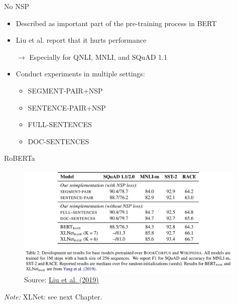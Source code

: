 
\begin{frame}{No NSP}

\vfill

	\begin{itemize}
		\item Described as important part of the pre-training process in BERT
		\item Liu et al. report that it hurts performance
		\item[$\to$] Especially for QNLI, MNLI, and SQuAD 1.1
		\item Conduct experiments in multiple settings: 
			\begin{itemize}
				\item SEGMENT-PAIR+NSP
				\item SENTENCE-PAIR+NSP
				\item FULL-SENTENCES
				\item DOC-SENTENCES
			\end{itemize}
	\end{itemize}
	
\vfill

\end{frame}

\begin{frame}{RoBERTa \href{https://arxiv.org/pdf/1907.11692.pdf}{}}

\vfill

\begin{figure}
\centering
\includegraphics[width = 11cm]{figure/roberta-nsp.png}\\ 
\footnotesize{Source:} \href{https://arxiv.org/pdf/1907.11692.pdf}{\footnotesize Liu et al. (2019)}
\end{figure}
\footnotesize
\textit{Note:} XLNet: see next Chapter.

\vfill

\end{frame}

